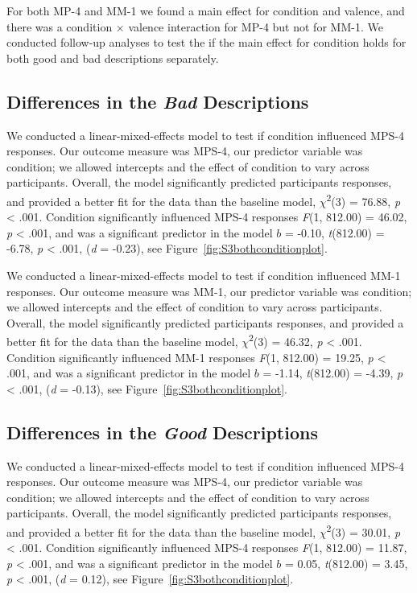 \documentclass[
  man,floatsintext]{apa7}
\begin{document}
For both MP-4 and MM-1 we found a main effect for condition and valence, and there was a condition \(\times\) valence interaction for MP-4 but not for MM-1. We conducted follow-up analyses to test the if the main effect for condition holds for both good and bad descriptions separately.

\subsection{\texorpdfstring{Differences in the \emph{Bad} Descriptions}{Differences in the Bad Descriptions}}\label{differences-in-the-bad-descriptions}

We conducted a linear-mixed-effects model to test if condition influenced MPS-4 responses. Our outcome measure was MPS-4, our predictor variable was condition; we allowed intercepts and the effect of condition to vary across participants. Overall, the model significantly predicted participants responses, and provided a better fit for the data than the baseline model, \(\chi\)\textsuperscript{2}(3) = 76.88, \emph{p} \textless{} .001. Condition significantly influenced MPS-4 responses \emph{F}(1, 812.00) = 46.02, \emph{p} \textless{} .001, and was a significant predictor in the model \(b\) = -0.10, \emph{t}(812.00) = -6.78, \emph{p} \textless{} .001, (\emph{d} = -0.23), see Figure~\ref{fig:S3bothconditionplot}.

We conducted a linear-mixed-effects model to test if condition influenced MM-1 responses. Our outcome measure was MM-1, our predictor variable was condition; we allowed intercepts and the effect of condition to vary across participants. Overall, the model significantly predicted participants responses, and provided a better fit for the data than the baseline model, \(\chi\)\textsuperscript{2}(3) = 46.32, \emph{p} \textless{} .001. Condition significantly influenced MM-1 responses \emph{F}(1, 812.00) = 19.25, \emph{p} \textless{} .001, and was a significant predictor in the model \(b\) = -1.14, \emph{t}(812.00) = -4.39, \emph{p} \textless{} .001, (\emph{d} = -0.13), see Figure~\ref{fig:S3bothconditionplot}.

\subsection{\texorpdfstring{Differences in the \emph{Good} Descriptions}{Differences in the Good Descriptions}}\label{differences-in-the-good-descriptions}

We conducted a linear-mixed-effects model to test if condition influenced MPS-4 responses. Our outcome measure was MPS-4, our predictor variable was condition; we allowed intercepts and the effect of condition to vary across participants. Overall, the model significantly predicted participants responses, and provided a better fit for the data than the baseline model, \(\chi\)\textsuperscript{2}(3) = 30.01, \emph{p} \textless{} .001. Condition significantly influenced MPS-4 responses \emph{F}(1, 812.00) = 11.87, \emph{p} \textless{} .001, and was a significant predictor in the model \(b\) = 0.05, \emph{t}(812.00) = 3.45, \emph{p} \textless{} .001, (\emph{d} = 0.12), see Figure~\ref{fig:S3bothconditionplot}.
\end{document}
